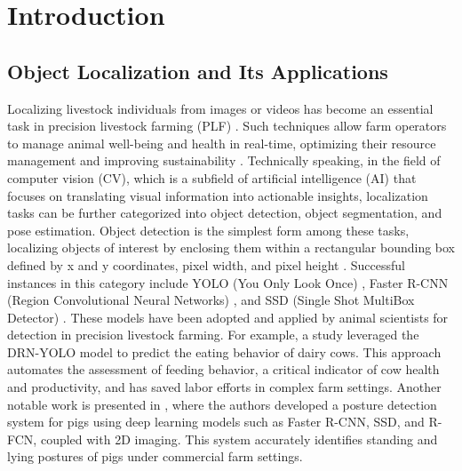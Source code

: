 \section{Introduction}

\subsection*{Object Localization and Its Applications}

Localizing livestock individuals from images or videos has become an essential task in precision livestock farming (PLF) \cite{fernandes2020image}. Such techniques allow farm operators to manage animal well-being and health in real-time, optimizing their resource management and improving sustainability \cite{morrone2022industry, hao2023cattle}. Technically speaking, in the field of computer vision (CV), which is a subfield of artificial intelligence (AI) that focuses on translating visual information into actionable insights, localization tasks can be further categorized into object detection, object segmentation, and pose estimation. Object detection is the simplest form among these tasks, localizing objects of interest by enclosing them within a rectangular bounding box defined by x and y coordinates, pixel width, and pixel height \cite{viola2001rapid}. Successful instances in this category include YOLO (You Only Look Once) \cite{redmon2016you}, Faster R-CNN (Region Convolutional Neural Networks) \cite{girshick2015fast}, and SSD (Single Shot MultiBox Detector) \cite{liu2016ssd}. These models have been adopted and applied by animal scientists for detection in precision livestock farming. For example, a study \cite{yu2022automatic} leveraged the DRN-YOLO model \cite{xu2020improved} to predict the eating behavior of dairy cows. This approach automates the assessment of feeding behavior, a critical indicator of cow health and productivity, and has saved labor efforts in complex farm settings. Another notable work is presented in \cite{nasirahmadi2019deep}, where the authors developed a posture detection system for pigs using deep learning models such as Faster R-CNN, SSD, and R-FCN, coupled with 2D imaging. This system accurately identifies standing and lying postures of pigs under commercial farm settings.

